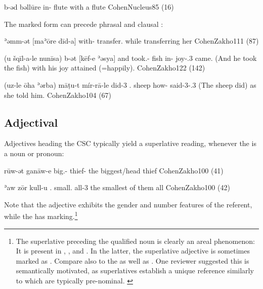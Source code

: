  
 

 

 
 {b-əd bəllūre}
 {in-\cst{} flute}
 {with a flute}
 {CohenNucleus}{85 (16)}


\largerpage[2]
The \cst* marked form can precede phrasal and clausal \secns:

{ʾəmm-ət [maʾōre dīd-a]}
{with-\cst{} transfer.\inf{} \fem}
{while transferring her}
{CohenZakho}{111 (87)}\antipar\newpage 

{(u\cb{} šqīl-a-le nunīsa) b-ət [kēf-e ʾəsya]}
{and\cb{} took.\fem-\masc{} fish in-\cst{} joy-\poss.3\masc{} came.\resl}
{(And he took the fish) with his joy attained (=happily).}
{CohenZakho}{122 (142)}


{(uz-le ōha ʾərba) māṭu-t mír-rā-le}
{did-3\masc{} \dem.\masc{} sheep how-\cst{} said-3\fem-\dat.3\masc}
{(The sheep did) as she told him.}
{CohenZakho}{104 (67)}




\subsection{Adjectival \prims} \label{ss:JZax_Adj_Head}
 
Adjectives heading the CSC typically yield a superlative reading, whenever the \secn is a \pl* noun or pronoun:

{rūw-ət ganāw-e}
{big.\masc-\cst{} thief-\pl}
{the biggest/head thief}
{CohenZakho}{100 (41)}\antipar

 
{ʾaw zōr kull-u}
{.\masc{} small.\cst{} all-3\pl}
{the smallest of them all}
{CohenZakho}{100 (42)}

 

	Note that the \prim adjective exhibits the gender and number features of the referent, while the \secn has \pl* marking.\footnote{The superlative preceding the qualified noun is clearly an areal phenomenon: It is present in \Arab, \Sor \parencites[68]{MacKenzie}[19]{ThackstonSorani}, and \Kur \citep[28]{ThackstonKurmanji}. In the latter, the superlative adjective is sometimes marked as \cst*. Compare also to the \Syr {} as well as . One reviewer suggested this is semantically motivated, as superlatives establish a unique reference similarly to  which are typically pre-nominal.
	\label{ft:JZax_superlative}} 

